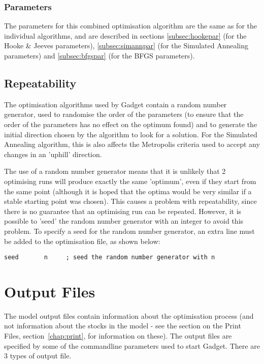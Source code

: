 \documentclass [a4paper, 10pt]{book}
\begin{document}
\subsection{Parameters}\label{subsec:combinepar}
The parameters for this combined optimisation algorithm are the same as for the individual algorithms, and are described in sections \ref{subsec:hookepar} (for the Hooke \& Jeeves parameters), \ref{subsec:simannpar} (for the Simulated Annealing parameters) and \ref{subsec:bfgspar} (for the BFGS parameters).

\section{Repeatability}\label{sec:repeat}
The optimisation algorithms used by Gadget contain a random number generator, used to randomise the order of the parameters (to ensure that the order of the parameters has no effect on the optimum found) and to generate the initial direction chosen by the algorithm to look for a solution.  For the Simulated Annealing algorithm, this is also affects the Metropolis criteria used to accept any changes in an 'uphill' direction.

\bigskip
The use of a random number generator means that it is unlikely that 2 optimising runs will produce exactly the same 'optimum', even if they start from the same point (although it is hoped that the optima would be very similar if a stable starting point was chosen).  This causes a problem with repeatability, since there is no guarantee that an optimising run can be repeated.  However, it is possible to 'seed' the random number generator with an integer to avoid this problem.  To specify a seed for the random number generator, an extra line must be added to the optimisation file, as shown below:

{\small\begin{verbatim}
seed       n     ; seed the random number generator with n
\end{verbatim}}

\chapter{Output Files}\label{chap:output}
The model output files contain information about the optimisation process (and not information about the stocks in the model - see the section on the Print Files, section~\ref{chap:print}, for information on these).  The output files are specified by some of the commandline parameters used to start Gadget.  There are 3 types of output file.
\end{document}
